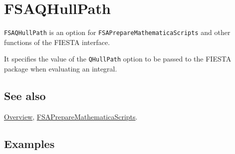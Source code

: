 \documentclass[../FeynHelpersManual.tex]{subfiles}
\begin{document}
\begin{Shaded}
\begin{Highlighting}[]
 
\end{Highlighting}
\end{Shaded}

\hypertarget{fsaqhullpath}{
\section{FSAQHullPath}\label{fsaqhullpath}}

\texttt{FSAQHullPath} is an option for
\texttt{FSAPrepareMathematicaScripts} and other functions of the FIESTA
interface.

It specifies the value of the \texttt{QHullPath} option to be passed to
the FIESTA package when evaluating an integral.

\subsection{See also}

\hyperlink{toc}{Overview},
\hyperlink{fsapreparemathematicascripts}{FSAPrepareMathematicaScripts}.

\subsection{Examples}
\end{document}
